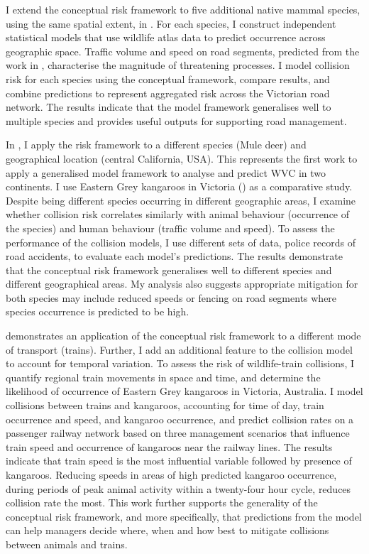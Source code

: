 \documentclass[titlesmallcaps,copyrightpage,examinerscopy]{uomthesis}
\begin{document}
I extend the conceptual risk framework to five additional native mammal species, using the same spatial extent, in . For each species, I construct independent statistical models that use wildlife atlas data to predict occurrence across geographic space. Traffic volume and speed on road segments, predicted from the work in , characterise the magnitude of threatening processes. I model collision risk for each species using the conceptual framework, compare results, and combine predictions to represent aggregated risk across the Victorian road network. The results indicate that the model framework generalises well to multiple species and provides useful outputs for supporting road management. 

In , I apply the risk framework to a different species (Mule deer) and geographical location (central California, USA). This represents the first work to apply a generalised model framework to analyse and predict WVC in two continents. I use Eastern Grey kangaroos in Victoria () as a comparative study. Despite being different species occurring in different geographic areas, I examine whether collision risk correlates similarly with animal behaviour (occurrence of the species) and human behaviour (traffic volume and speed). To assess the performance of the collision models, I use different sets of data, police records of road accidents, to evaluate each model's predictions. The results demonstrate that the conceptual risk framework generalises well to different species and different geographical areas. My analysis also suggests appropriate mitigation for both species may include reduced speeds or fencing on road segments where species occurrence is predicted to be high.

 demonstrates an application of the conceptual risk framework to a different mode of transport (trains). Further, I add an additional feature to the collision model to account for temporal variation. To assess the risk of wildlife-train collisions, I quantify regional train movements in space and time, and determine the likelihood of occurrence of Eastern Grey kangaroos in Victoria, Australia. I model collisions between trains and kangaroos, accounting for time of day, train occurrence and speed, and kangaroo occurrence, and predict collision rates on a passenger railway network based on three management scenarios that influence train speed and occurrence of kangaroos near the railway lines. The results indicate that train speed is the most influential variable followed by presence of kangaroos.  Reducing speeds in areas of high predicted kangaroo occurrence, during periods of peak animal activity within a twenty-four hour cycle, reduces collision rate the most. This work further supports the generality of the conceptual risk framework, and more specifically, that predictions from the model can help managers decide where, when and how best to mitigate collisions between animals and trains.
\end{document}
